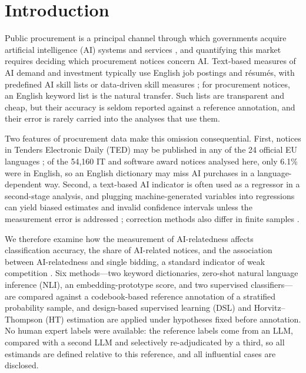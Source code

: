 \documentclass[runningheads]{llncs}
\begin{document}
\section{Introduction}
Public procurement is a principal channel through which governments acquire artificial intelligence (AI) systems and services \cite{hickok2022}, and quantifying this market requires deciding which procurement notices concern AI. Text-based measures of AI demand and investment typically use English job postings and r\'esum\'es, with predefined AI skill lists \cite{acemoglu2022} or data-driven skill measures \cite{babina2024}; for procurement notices, an English keyword list is the natural transfer. Such lists are transparent and cheap, but their accuracy is seldom reported against a reference annotation, and their error is rarely carried into the analyses that use them.

Two features of procurement data make this omission consequential. First, notices in Tenders Electronic Daily (TED) may be published in any of the 24 official EU languages \cite{ahmia2018}; of the 54,160 IT and software award notices analysed here, only 6.1\% were in English, so an English dictionary may miss AI purchases in a language-dependent way. Second, a text-based AI indicator is often used as a regressor in a second-stage analysis, and plugging machine-generated variables into regressions can yield biased estimates and invalid confidence intervals unless the measurement error is addressed \cite{battaglia2025,egami2023}; correction methods also differ in finite samples \cite{audinet2025}.

We therefore examine how the measurement of AI-relatedness affects classification accuracy, the share of AI-related notices, and the association between AI-relatedness and single bidding, a standard indicator of weak competition \cite{fazekas2016}. Six methods---two keyword dictionaries, zero-shot natural language inference (NLI), an embedding-prototype score, and two supervised classifiers---are compared against a codebook-based reference annotation of a stratified probability sample, and design-based supervised learning (DSL) \cite{egami2023} and Horvitz--Thompson (HT) estimation are applied under hypotheses fixed before annotation. No human expert labels were available: the reference labels come from an LLM, compared with a second LLM and selectively re-adjudicated by a third, so all estimands are defined relative to this reference, and all influential cases are disclosed.
\end{document}
